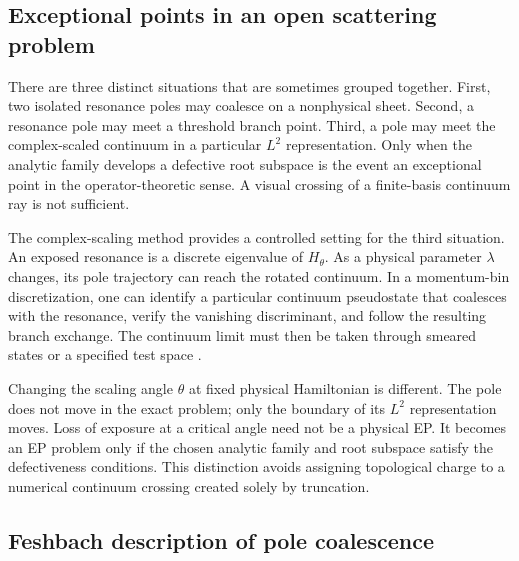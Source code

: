 \subsection{Exceptional points in an open scattering problem}
\label{subsec:ep-scattering}

There are three distinct situations that are sometimes grouped together.
First, two isolated resonance poles may coalesce on a nonphysical sheet.
Second, a resonance pole may meet a threshold branch point.  Third, a pole may
meet the complex-scaled continuum in a particular $L^2$ representation.  Only
when the analytic family develops a defective root subspace is the event an
exceptional point in the operator-theoretic sense.  A visual crossing of a
finite-basis continuum ray is not sufficient.

The complex-scaling method provides a controlled setting for the third
situation.  An exposed resonance is a discrete eigenvalue of $H_\theta$.  As a
physical parameter $\lambda$ changes, its pole trajectory can reach the
rotated continuum.  In a momentum-bin discretization, one can identify a
particular continuum pseudostate that coalesces with the resonance, verify the
vanishing discriminant, and follow the resulting branch exchange.  The
continuum limit must then be taken through smeared states or a specified test
space
\cite{Morikawa:2025inx}.

Changing the scaling angle $\theta$ at fixed physical Hamiltonian is different.
The pole does not move in the exact problem; only the boundary of its $L^2$
representation moves.  Loss of exposure at a critical angle need not be a
physical EP.  It becomes an EP problem only if the chosen analytic family and
root subspace satisfy the defectiveness conditions.  This distinction avoids
assigning topological charge to a numerical continuum crossing created solely
by truncation.

\subsection{Feshbach description of pole coalescence}
\label{subsec:ep-feshbach}

